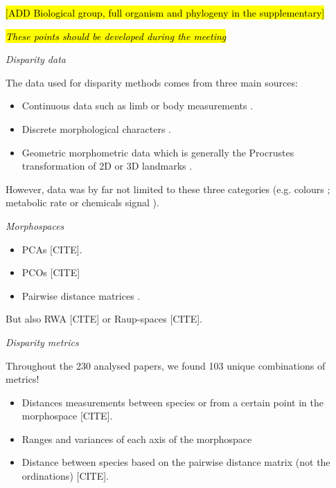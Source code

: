 \documentclass[12pt,letterpaper]{article}
\renewcommand{\subsection}[1]{%
\bigskip
\begin{center}
\begin{large}
\normalfont\itshape #1
\end{large}
\end{center}}
\begin{document}
\hl{[ADD Biological group, full organism and phylogeny in the supplementary]}

\noindent \hl{\textit{These points should be developed during the meeting}}


\subsection{Disparity data}
The data used for disparity methods comes from three main sources:
\begin{itemize}
    \item Continuous data such as limb or body measurements \citep{slaterCetacean}.
    \item Discrete morphological characters \citep[sometimes referred to as ``Cladistic'' characters; ][]{Brusatte12092008}.
    \item Geometric morphometric data which is generally the Procrustes transformation of 2D or 3D landmarks \citep{cooney2017mega}.
\end{itemize}

However, data was by far not limited to these three categories (e.g. colours \citealt{maia2013key}; metabolic rate \citealt{nespolo2016studying} or chemicals signal \citealt{garcia2017heterogeneous}).

\subsection{Morphospaces}
\begin{itemize}
    \item PCAs [CITE].
    \item PCOs [CITE]
    \item Pairwise distance matrices \citep[no ordination; ][]{Harmon961}.
\end{itemize}

But also RWA [CITE] or Raup-spaces [CITE].

\subsection{Disparity metrics}
Throughout the 230 analysed papers, we found 103 unique combinations of metrics!

\begin{itemize}
    \item Distances measurements between species or from a certain point in the morphospace [CITE].
    \item Ranges and variances of each axis of the morphospace \cite{Wills2001,Ciampaglio2001}
    \item Distance between species based on the pairwise distance matrix (not the ordinations) [CITE].
\end{itemize}
\end{document}
